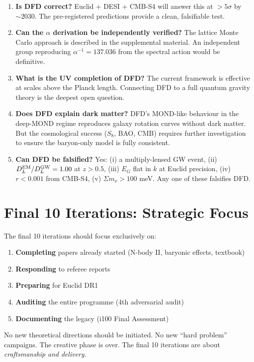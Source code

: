\documentclass[11pt,a4paper]{article}
\begin{document}
\begin{enumerate}
\item \textbf{Is DFD correct?} Euclid + DESI + CMB-S4 will answer this at $> 5\sigma$ by $\sim 2030$. The pre-registered predictions provide a clean, falsifiable test.

\item \textbf{Can the $\alpha$ derivation be independently verified?} The lattice Monte Carlo approach is described in the supplemental material. An independent group reproducing $\alpha^{-1} = 137.036$ from the spectral action would be definitive.

\item \textbf{What is the UV completion of DFD?} The current framework is effective at scales above the Planck length. Connecting DFD to a full quantum gravity theory is the deepest open question.

\item \textbf{Does DFD explain dark matter?} DFD's MOND-like behaviour in the deep-MOND regime reproduces galaxy rotation curves without dark matter. But the cosmological success ($S_8$, BAO, CMB) requires further investigation to ensure the baryon-only model is fully consistent.

\item \textbf{Can DFD be falsified?} Yes: (i) a multiply-lensed GW event, (ii) $D_L^{\rm EM}/D_L^{\rm GW} = 1.00$ at $z > 0.5$, (iii) $E_G$ flat in $k$ at Euclid precision, (iv) $r < 0.001$ from CMB-S4, (v) $\Sigma m_\nu > 100$ meV. Any one of these falsifies DFD.
\end{enumerate}

\section{Final 10 Iterations: Strategic Focus}

\begin{tcolorbox}[colback=blue!5!white, colframe=dfdblue, title=\textbf{i91--i100: Completion, Not Creation}]
The final 10 iterations should focus exclusively on:
\begin{enumerate}[nosep]
\item \textbf{Completing} papers already started (N-body II, baryonic effects, textbook)
\item \textbf{Responding} to referee reports
\item \textbf{Preparing} for Euclid DR1
\item \textbf{Auditing} the entire programme (4th adversarial audit)
\item \textbf{Documenting} the legacy (i100 Final Assessment)
\end{enumerate}

No new theoretical directions should be initiated. No new ``hard problem'' campaigns. The creative phase is over. The final 10 iterations are about \emph{craftsmanship and delivery}.
\end{tcolorbox}
\end{document}
